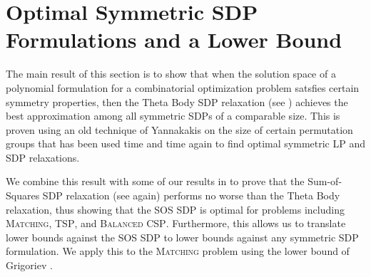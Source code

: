 \chapter{Optimal Symmetric SDP Formulations and a Lower Bound}\label{cha:symmetric_sdps}
The main result of this section is to show that when the solution space of a polynomial formulation for a combinatorial optimization problem satsfies certain symmetry properties, then the Theta Body SDP relaxation (see ) achieves the best approximation among all symmetric SDPs of a comparable size. This is proven using an old technique of Yannakakis on the size of certain permutation groups that has been used time and time again to find optimal symmetric LP and SDP relaxations. 

We combine this result with some of our results in  to prove that the Sum-of-Squares SDP relaxation (see  again) performs no worse than the Theta Body relaxation, thus showing that the SOS SDP is optimal for problems including \textsc{Matching}, \textsc{TSP}, and \textsc{Balanced CSP}. Furthermore, this allows us to translate lower bounds against the SOS SDP to lower bounds against any symmetric SDP formulation. We apply this to the \textsc{Matching} problem using the lower bound of Grigoriev \cite{Gri01}.

